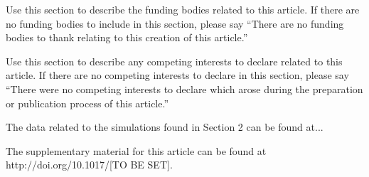 \documentclass{aptpub}
\begin{document}
\fund %
\noindent Use this section to describe the funding bodies related to this article. If there are no funding bodies to include in this section, please say ``There are no funding bodies to thank relating to this creation of this article.''



\competing %
\noindent Use this section to describe any competing interests to declare related to this article. If there are no competing interests to declare in this section, please say ``There were no competing interests to declare which arose during the preparation or publication process of this article.''



\data %
\noindent The data related to the simulations found in Section 2 can be found at...



\supp \noindent The supplementary material for this article can be found at http://doi.org/10.1017/[TO BE SET]. %



%
%
%
%



\end{document}

